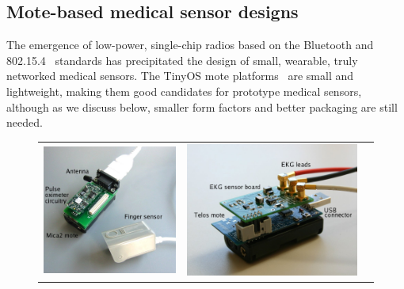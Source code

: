 \subsection{Mote-based medical sensor designs}
\label{sec-cb-hardware}

The emergence of low-power, single-chip radios based on the
Bluetooth and 802.15.4~\cite{ieee-802.15.4} standards has precipitated 
the design of small, wearable, truly networked medical sensors. 
The TinyOS mote platforms~\cite{micaz,telos} are small
and lightweight, making them good candidates for prototype medical
sensors, although as we discuss below, smaller form factors and 
better packaging are still needed.

\begin{figure}[t]
\begin{center}
\begin{tabular}{ccc}
\includegraphics[height=0.18\vsize]{./resources/codeblue-nsdi06/figures/pics/vitaldust3-annotate.jpg}
&
\includegraphics[height=0.18\vsize]{./resources/codeblue-nsdi06/figures/pics/telos-ekg3.jpg} &

\end{tabular}
\end{center}
\end{figure}
